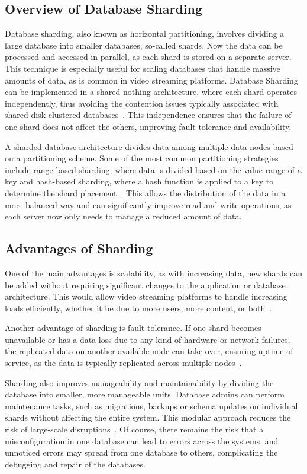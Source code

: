 \subsection{Overview of Database Sharding}
Database sharding, also known as horizontal partitioning, involves dividing a large database into smaller databases, so-called shards. Now the data can be processed and accessed in parallel, as each shard is stored on a separate server. This technique is especially useful for scaling databases that handle massive amounts of data, as is common in video streaming platforms. Database Sharding can be implemented in a shared-nothing architecture, where each shard operates independently, thus avoiding the contention issues typically associated with shared-disk clustered databases~\parencite{db_sharding}. This independence ensures that the failure of one shard does not affect the others, improving fault tolerance and availability.

A sharded database architecture divides data among multiple data nodes based on a partitioning scheme. Some of the most common partitioning strategies include range-based sharding, where data is divided based on the value range of a key and hash-based sharding, where a hash function is applied to a key to determine the shard placement~\parencite{db_sharding}. This allows the distribution of the data in a more balanced way and can significantly improve read and write operations, as each server now only needs to manage a reduced amount of data.

\subsection{Advantages of Sharding}
One of the main advantages is scalability, as with increasing data, new shards can be added without requiring significant changes to the application or database architecture. This would allow video streaming platforms to handle increasing loads efficiently, whether it be due to more users, more content, or both~\parencite{db_sharding}.

Another advantage of sharding is fault tolerance. If one shard becomes unavailable or has a data loss due to any kind of hardware or network failures, the replicated data on another available node can take over, ensuring uptime of service, as the data is typically replicated across multiple nodes~\parencite{db_sharding}.

\noindent Sharding also improves manageability and maintainability by dividing the database into smaller, more manageable units. Database admins can perform maintenance tasks, such as migrations, backups or schema updates on individual shards without affecting the entire system. This modular approach reduces the risk of large-scale disruptions~\parencite{db_sharding}. Of course, there remains the risk that a misconfiguration in one database can lead to errors across the systems, and unnoticed errors may spread from one database to others, complicating the debugging and repair of the databases.

